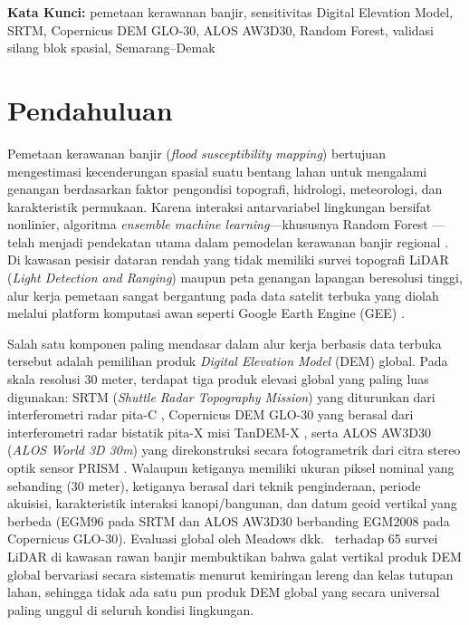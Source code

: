 \documentclass[11pt,twoside]{article}
\newcommand{\SMDSKeywords}[1]{
\vspace{0.5em}
\noindent\textbf{Kata Kunci:} #1
}
\begin{document}
\SMDSKeywords{pemetaan kerawanan banjir, sensitivitas Digital Elevation Model, SRTM, Copernicus DEM GLO-30, ALOS AW3D30, Random Forest, validasi silang blok spasial, Semarang--Demak}

\section{Pendahuluan}\label{sec:pendahuluan}

Pemetaan kerawanan banjir (\textit{flood susceptibility mapping}) bertujuan mengestimasi kecenderungan spasial suatu bentang lahan untuk mengalami genangan berdasarkan faktor pengondisi topografi, hidrologi, meteorologi, dan karakteristik permukaan. Karena interaksi antarvariabel lingkungan bersifat nonlinier, algoritma \textit{ensemble machine learning}---khususnya Random Forest \cite{breiman2001}---telah menjadi pendekatan utama dalam pemodelan kerawanan banjir regional \cite{saha2021,avand2022,hakim2026}. Di kawasan pesisir dataran rendah yang tidak memiliki survei topografi LiDAR (\textit{Light Detection and Ranging}) maupun peta genangan lapangan beresolusi tinggi, alur kerja pemetaan sangat bergantung pada data satelit terbuka yang diolah melalui platform komputasi awan seperti Google Earth Engine (GEE) \cite{gorelick2017}.

Salah satu komponen paling mendasar dalam alur kerja berbasis data terbuka tersebut adalah pemilihan produk \textit{Digital Elevation Model} (DEM) global. Pada skala resolusi 30 meter, terdapat tiga produk elevasi global yang paling luas digunakan: SRTM (\textit{Shuttle Radar Topography Mission}) yang diturunkan dari interferometri radar pita-C \cite{farr2007}, Copernicus DEM GLO-30 yang berasal dari interferometri radar bistatik pita-X misi TanDEM-X \cite{esa_glo30}, serta ALOS AW3D30 (\textit{ALOS World 3D 30m}) yang direkonstruksi secara fotogrametrik dari citra stereo optik sensor PRISM \cite{tadono2016}. Walaupun ketiganya memiliki ukuran piksel nominal yang sebanding (30 meter), ketiganya berasal dari teknik penginderaan, periode akuisisi, karakteristik interaksi kanopi/bangunan, dan datum geoid vertikal yang berbeda (EGM96 pada SRTM dan ALOS AW3D30 berbanding EGM2008 pada Copernicus GLO-30). Evaluasi global oleh Meadows dkk.\ \cite{meadows2024} terhadap 65 survei LiDAR di kawasan rawan banjir membuktikan bahwa galat vertikal produk DEM global bervariasi secara sistematis menurut kemiringan lereng dan kelas tutupan lahan, sehingga tidak ada satu pun produk DEM global yang secara universal paling unggul di seluruh kondisi lingkungan.
\end{document}
